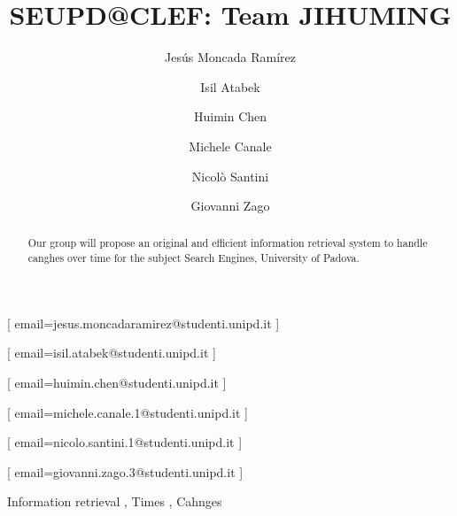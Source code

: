 \documentclass{ceurart}
\begin{document}


\title{SEUPD@CLEF: Team JIHUMING}

\author[1]{Jesús Moncada Ramírez}[%
email=jesus.moncadaramirez@studenti.unipd.it
]

\author[1]{Isil Atabek}[%
email=isil.atabek@studenti.unipd.it
]

\author[1]{Huimin Chen}[%
email=huimin.chen@studenti.unipd.it
]

\author[1]{Michele	Canale}[%
email=michele.canale.1@studenti.unipd.it
]

\author[1]{Nicolò Santini}[%
email=nicolo.santini.1@studenti.unipd.it
]

\author[1]{Giovanni Zago}[%
email=giovanni.zago.3@studenti.unipd.it
]


\begin{abstract}
  Our group will propose an original and efficient information retrieval
  system to handle canghes over time for the subject Search Engines,
  University of Padova.
\end{abstract}

\begin{keywords}
  Information retrieval \sep
  Times \sep
  Cahnges 
\end{keywords}

\maketitle
\end{document}
